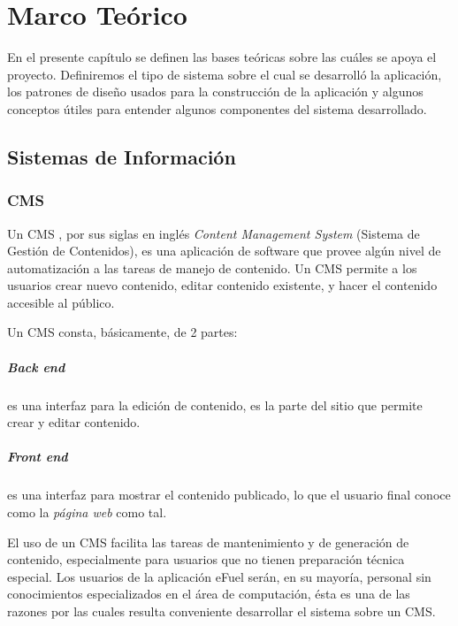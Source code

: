 \chapter{Marco Teórico}
En el presente capítulo se definen las bases teóricas sobre las cuáles se apoya el proyecto. Definiremos el tipo de sistema sobre el cual se desarrolló la aplicación, los patrones de diseño usados para la construcción de la aplicación y algunos conceptos útiles para entender algunos componentes del sistema desarrollado.

\section{Sistemas de Información}
    \subsection{CMS}
    Un CMS \cite{cmsBarker}, por sus siglas en inglés \textit{Content Management System} (Sistema de Gestión de Contenidos), es una aplicación de software que provee algún nivel de automatización a las tareas de manejo de contenido. Un CMS permite a los usuarios crear nuevo contenido, editar contenido existente, y hacer el contenido accesible al público.

    Un CMS consta, básicamente, de 2 partes:
    
    \paragraph*{Back end} \label{backEndCMS} es una interfaz para la edición de contenido, es la parte del sitio que permite crear y editar contenido.
    \paragraph*{Front end} es una interfaz para mostrar el contenido publicado, lo que el usuario final conoce como la \emph{página web} como tal.

    El uso de un CMS facilita las tareas de mantenimiento y de generación de contenido, especialmente para usuarios que no tienen preparación técnica especial. Los usuarios de la aplicación eFuel serán, en su mayoría, personal sin conocimientos especializados en el área de computación, ésta es una de las razones por las cuales resulta conveniente desarrollar el sistema sobre un CMS.

